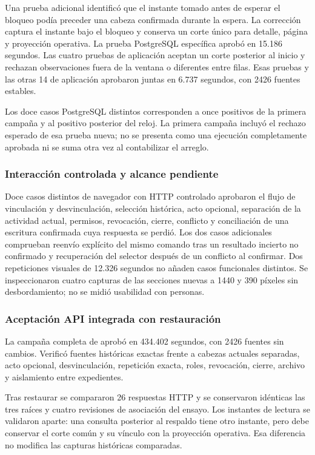Una prueba adicional identificó que el instante tomado antes de esperar el bloqueo podía preceder una cabeza confirmada durante la espera. La corrección captura el instante bajo el bloqueo y conserva un corte único para detalle, página y proyección operativa. La prueba PostgreSQL específica aprobó en 15.186 segundos. Las cuatro pruebas de aplicación aceptan un corte posterior al inicio y rechazan observaciones fuera de la ventana o diferentes entre filas. Esas pruebas y las otras 14 de aplicación aprobaron juntas en 6.737 segundos, con 2426 fuentes estables.

Los doce casos PostgreSQL distintos corresponden a once positivos de la primera campaña y al positivo posterior del reloj. La primera campaña incluyó el rechazo esperado de esa prueba nueva; no se presenta como una ejecución completamente aprobada ni se suma otra vez al contabilizar el arreglo.

\subsubsection{Interacción controlada y alcance pendiente}

Doce casos distintos de navegador con HTTP controlado aprobaron el flujo de vinculación y desvinculación, selección histórica, acto opcional, separación de la actividad actual, permisos, revocación, cierre, conflicto y conciliación de una escritura confirmada cuya respuesta se perdió. Los dos casos adicionales comprueban reenvío explícito del mismo comando tras un resultado incierto no confirmado y recuperación del selector después de un conflicto al confirmar. Dos repeticiones visuales de 12.326 segundos no añaden casos funcionales distintos. Se inspeccionaron cuatro capturas de las secciones nuevas a 1440 y 390 píxeles sin desbordamiento; no se midió usabilidad con personas.

\subsubsection{Aceptación API integrada con restauración}

La campaña completa de  aprobó en 434.402 segundos, con 2426 fuentes sin cambios. Verificó fuentes históricas exactas frente a cabezas actuales separadas, acto opcional, desvinculación, repetición exacta, roles, revocación, cierre, archivo y aislamiento entre expedientes.

Tras restaurar se compararon 26 respuestas HTTP y se conservaron idénticas las tres raíces y cuatro revisiones de asociación del ensayo. Los instantes de lectura se validaron aparte: una consulta posterior al respaldo tiene otro instante, pero debe conservar el corte común y su vínculo con la proyección operativa. Esa diferencia no modifica las capturas históricas comparadas.

